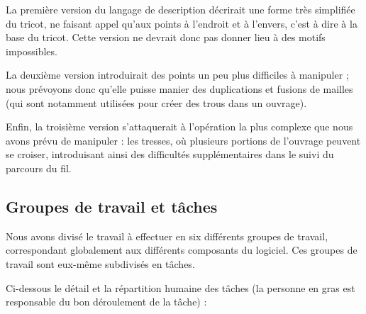 \documentclass{article}
\begin{document}
La première version du langage de description décrirait une forme très simplifiée du tricot, ne faisant appel qu'aux points à l'endroit
et à l'envers, c'est à dire à la base du tricot. Cette version ne devrait donc pas donner lieu à des motifs impossibles.

La deuxième version introduirait des points un peu plus difficiles à manipuler ; nous prévoyons donc qu'elle puisse manier des duplications et
fusions de mailles (qui sont notamment utilisées pour créer des trous dans un ouvrage).

Enfin, la troisième version s'attaquerait à l'opération la plus complexe que nous avons prévu de manipuler : les tresses, où plusieurs portions
de l'ouvrage peuvent se croiser, introduisant ainsi des difficultés supplémentaires dans le suivi du parcours du fil.

\subsection{Groupes de travail et tâches\label{workpackages}}

Nous avons divisé le travail à effectuer en six différents groupes de travail, correspondant globalement aux différents composants du
logiciel. Ces groupes de travail sont eux-même subdivisés en tâches.

Ci-dessous le détail et la répartition humaine des tâches (la personne en gras est responsable du bon déroulement de la tâche) : \newline
\end{document}
